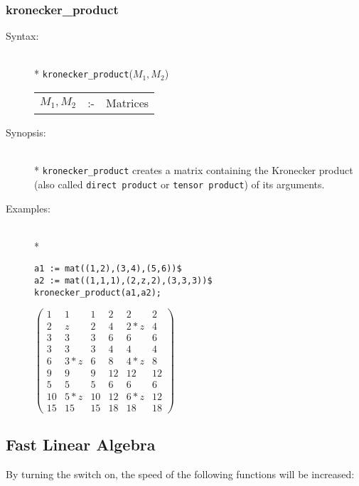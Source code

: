\subsubsection{kronecker\_product}
\label{linalg:kronecker_product}
\begin{description}
\item[Syntax:]\mbox{}\\*
\texttt{kronecker\_product}($M_1,M_2$)\\[2mm]
\begin{tabular}{l l l}
$M_1,M_2$ &:-& Matrices
\end{tabular}

\item[Synopsis:]\mbox{}\\*
\texttt{kronecker\_product} creates a matrix containing the Kronecker product 
(also called \texttt{direct product} or \texttt{tensor product}) of its arguments.

\item[Examples:]\mbox{}\\*
\begin{verbatim}
a1 := mat((1,2),(3,4),(5,6))$
a2 := mat((1,1,1),(2,z,2),(3,3,3))$
kronecker_product(a1,a2);
\end{verbatim}
\begin{flushleft}
\begin{math}
\begin{pmatrix} 1 & 1 & 1 & 2 & 2 & 2 \\
2 &  z & 2 & 4  &2*z &4 \\
3 &  3 & 3 & 6  & 6  &6 \\
3 &  3 & 3 & 4  & 4  &4 \\
6 & 3*z& 6 & 8  &4*z &8 \\
9 &  9 & 9 & 12 &12  &12\\
5 &  5 & 5 & 6  & 6  &6 \\
10 &5*z& 10& 12 &6*z &12 \\ 
15 &15 & 15& 18 &18  &18
\end{pmatrix}
\end{math}
\end{flushleft}
\end{description}

\subsection{Fast Linear Algebra}

By turning the  switch on, the speed of the following 
functions will be increased:

